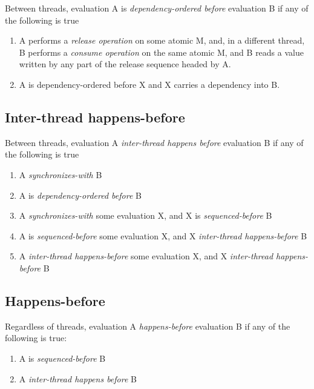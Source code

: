 \documentclass[a4paper,12pt,notitlepage,twoside,openright]{article}
\begin{document}
Between threads, evaluation A is \emph{dependency-ordered before}
evaluation B if any of the following is true

\begin{enumerate}
\item
  A performs a \emph{release operation} on some atomic M, and, in a
  different thread, B performs a \emph{consume operation} on the same
  atomic M, and B reads a value written by any part of the release
  sequence headed by A.
\item
  A is dependency-ordered before X and X carries a dependency into B.
\end{enumerate}

\hypertarget{inter-thread-happens-before}{%
\subsection{Inter-thread
happens-before}\label{inter-thread-happens-before}}

Between threads, evaluation A \emph{inter-thread happens before}
evaluation B if any of the following is true

\begin{enumerate}
\item
  A \emph{synchronizes-with} B
\item
  A is \emph{dependency-ordered before} B
\item
  A \emph{synchronizes-with} some evaluation X, and X is
  \emph{sequenced-before} B
\item
  A is \emph{sequenced-before} some evaluation X, and X
  \emph{inter-thread happens-before} B
\item
  A \emph{inter-thread happens-before} some evaluation X, and X
  \emph{inter-thread happens-before} B
\end{enumerate}

\hypertarget{happens-before}{%
\subsection{Happens-before}\label{happens-before}}

Regardless of threads, evaluation A \emph{happens-before} evaluation B
if any of the following is true:

\begin{enumerate}

\item
  A is \emph{sequenced-before} B
\item
  A \emph{inter-thread happens before} B
\end{enumerate}
\end{document}
